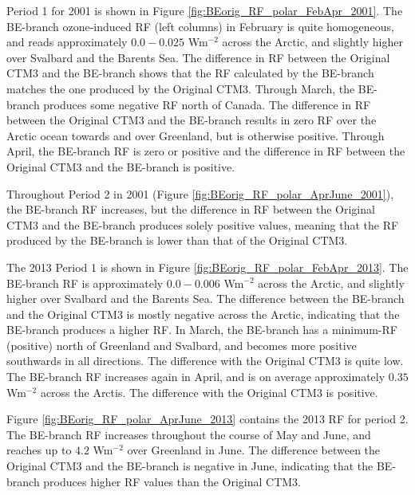 Period 1 for 2001 is shown in Figure \ref{fig:BEorig_RF_polar_FebApr_2001}. The BE-branch ozone-induced RF (left columns) in February is quite homogeneous, and reads approximately $0.0-0.025$ Wm$^{-2}$ across the Arctic, and slightly higher over Svalbard and the Barents Sea. The difference in RF between the Original CTM3 and the BE-branch shows that the RF calculated by the BE-branch matches the one produced by the Original CTM3. Through March, the BE-branch produces some negative RF north of Canada. The difference in RF between the Original CTM3 and the BE-branch results in zero RF over the Arctic ocean towards and over Greenland, but is otherwise positive. Through April, the BE-branch RF is zero or positive and the difference in RF between the Original CTM3 and the BE-branch is positive.

\medskip

Throughout Period 2 in 2001 (Figure \ref{fig:BEorig_RF_polar_AprJune_2001}), the BE-branch RF increases, but the difference in RF between the Original CTM3 and the BE-branch produces solely positive values, meaning that the RF produced by the BE-branch is lower than that of the Original CTM3.

\medskip

The 2013 Period 1 is shown in Figure \ref{fig:BEorig_RF_polar_FebApr_2013}. The BE-branch RF is approximately $0.0-0.006$ Wm$^{-2}$ across the Arctic, and slightly higher over Svalbard and the Barents Sea. The difference between the BE-branch and the Original CTM3 is mostly negative across the Arctic, indicating that the BE-branch produces a higher RF. In March, the BE-branch has a minimum-RF (positive) north of Greenland and Svalbard, and becomes more positive southwards in all directions. The difference with the Original CTM3 is quite low. The BE-branch RF increases again in April, and is on average approximately $0.35$ Wm$^{-2}$ across the Arctis. The difference with the Original CTM3 is positive.

\medskip

Figure \ref{fig:BEorig_RF_polar_AprJune_2013} contains the 2013 RF for period 2. The BE-branch RF increases throughout the course of May and June, and reaches up to $4.2$ Wm$^{-2}$ over Greenland in June. The difference between the Original CTM3 and the BE-branch is negative in June, indicating that the BE-branch produces higher RF values than the  Original CTM3.

\medskip

